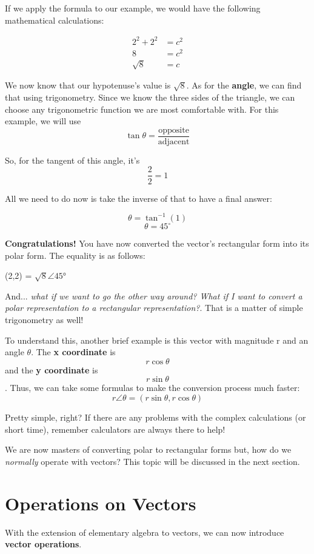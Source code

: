 If we apply the formula to our example, we would have the following mathematical calculations:

\begin{align*}
  2^2 + 2^2 &= c^2\\
  8 &= c^2\\
  \sqrt{8} &= c
\end{align*}

We now know that our hypotenuse's value is $\sqrt{8}$. As for the \textbf{angle}, we can find that using trigonometry. Since we know the three sides of the triangle, we can choose any trigonometric function we are most comfortable with. For this example, we will use \[\tan\theta = \frac{\text{opposite}}{\text{adjacent}}\]

So, for the tangent of this angle, it's \[\frac{2}{2} = 1\]

All we need to do now is take the inverse of that to have a final answer:

\[\theta = \tan^{-1}(1)\]
\[\theta = 45 ^{\circ}\]

\textbf{Congratulations!} You have now converted the vector's rectangular form into its polar form. The equality is as follows:

(2,2) = $\sqrt{8} \angle 45°$

And... \textit{what if we want to go the other way around? What if I want to convert a polar representation to a rectangular representation?}. That is a matter of simple trigonometry as well! 


To understand this, another brief example is this vector with magnitude r and an angle $\theta$. The \textbf{x coordinate} is \[r \cos\theta\] and the \textbf{y coordinate} is \[r \sin \theta\]. Thus, we can take some formulas to make the conversion process much faster:
\[r \angle \theta = (r \sin \theta, r \cos \theta)\]

Pretty simple, right? If there are any problems with the complex calculations (or short time), remember calculators are always there to help!

We are now masters of converting polar to rectangular forms but, how do we \textit{normally} operate with vectors? This topic will be discussed in the next section.

\section{Operations on Vectors}
With the extension of elementary algebra to vectors, we can now introduce \textbf{vector operations}.
